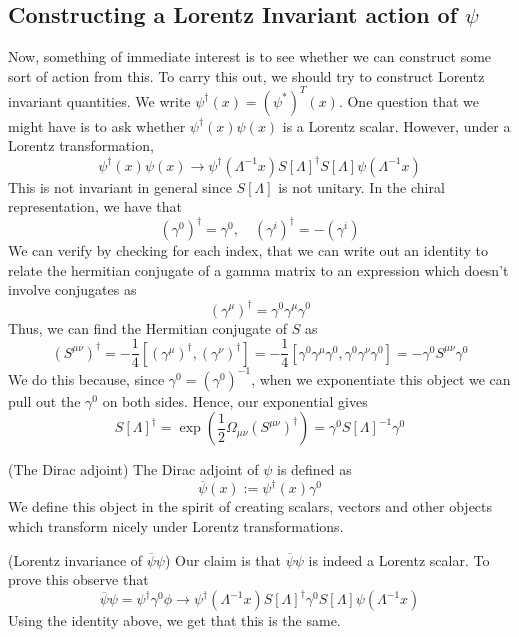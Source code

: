 \subsection{Constructing a Lorentz Invariant action of $ \psi $ }
Now, something of immediate interest is to see whether we 
can construct some sort of action from this. To carry this out, we
should try to construct Lorentz invariant quantities. 
We write $ \psi ^ \dagger ( x )   = ( \psi ^ * ) ^ T ( x ) $. 
One question that we might have is to ask whether 
$ \psi ^ \dagger ( x) \psi( x) $ is a Lorentz scalar. 
However, under a Lorentz transformation, 
\[
	\psi ^ \dagger ( x) \psi  ( x) \to \psi ^ \dagger ( \Lambda ^{ - 1} x ) 
	S [ \Lambda ] ^ \dagger S [ \Lambda ] \psi( \Lambda ^{ - 1}x ) 
\] This is not invariant in general since $ S [ \Lambda ] $ is 
not unitary. 
In the chiral representation, we have that 
\[
	( \gamma ^ 0 ) ^ \dagger  = \gamma ^ 0 , \quad ( \gamma ^ i) ^ \dagger = 
	 - ( \gamma ^ i ) 
\] We can verify by checking for each index, 
that we can write out an identity to relate 
the hermitian conjugate of a gamma matrix to 
an expression which doesn't involve conjugates as 
\[
 ( \gamma ^ \mu ) ^ \dagger = \gamma ^ 0 \gamma ^ \mu \gamma ^ 0 
\] Thus, we can find the Hermitian conjugate of $ S $ as 
\[
	( S ^{ \mu \nu } ) ^ \dagger = - \frac{1}{4 } [ ( \gamma ^ \mu ) ^ \dagger, 
	( \gamma^ \nu ) ^ \dagger ]  =
	- \frac{1}{4 } [ \gamma ^ 0 \gamma ^ \mu \gamma ^ 0 , 
	\gamma ^ 0 \gamma ^ \nu \gamma ^ 0 ]  = - \gamma ^ 0 S ^{ \mu \nu } \gamma ^ 0 
\]  We do this because, since $ \gamma ^ 0 = ( \gamma ^ 0 ) ^{ -1 } $, 
when we exponentiate this object we can pull out the $ \gamma ^ 0 $ on
both sides. Hence, our exponential gives 
\[
 S [ \Lambda ] ^ \dagger = \exp \left(  \frac{1}{2 } 
 \Omega _{ \mu \nu } ( S ^{ \mu \nu } ) ^ \dagger \right)   = \gamma ^ 0 S [ \Lambda ] ^{ - 1} 
 \gamma ^ 0 
\]
\begin{defn}{(The Dirac adjoint)}
	The Dirac adjoint of  $ \psi $ is defined as 
	\[
	\overline{\psi } ( x) := \psi ^ \dagger  (x) \gamma ^ 0 
\] We define this object in the spirit of 
creating scalars, vectors and other objects which transform nicely 
under Lorentz transformations. 
\end{defn}

 
\begin{claim}{(Lorentz invariance of $ \overline{\psi } \psi $)}
Our claim is that $ \overline{ \psi } \psi  $ is indeed a Lorentz scalar. 
To prove this 
observe that 
\[
	\overline{ \psi  } \psi  = \psi ^ \dagger \gamma ^ 0 \phi \to \psi ^ \dagger ( 
	\Lambda ^{ - 1} x ) S [ \Lambda ] ^ \dagger \gamma ^ 0 S [ \Lambda ] \psi ( 
	\Lambda ^{ - 1 }x ) 
\] Using the identity above, we get that this is 
the same. 
\end{claim} 

